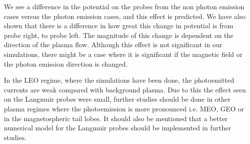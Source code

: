 
We see a difference in the potential on the probes from the non photon emission cases versus
the photon emission cases, and this effect is predicted. We have also shown that there
is a difference in how great this change in potential is from probe right, to probe left.
The magnitude of this change is dependent on the direction of the plasma flow. Although this effect
is not significant in our simulations, there might be a case where it is significant if
the magnetic field or the photon emission direction is changed.

In the LEO regime, where the simulations have been done, the photoemitted currents are weak compared with
background plasma. Due to this the effect seen on the Langmuir probes were small, further studies should be done
in other plasma regimes where the photoemission is more pronounced i.e. MEO, GEO or in the magnetospheric tail lobes.
It should also be mentioned that a better numerical model for the Langmuir probes should be implemented in further
studies.
